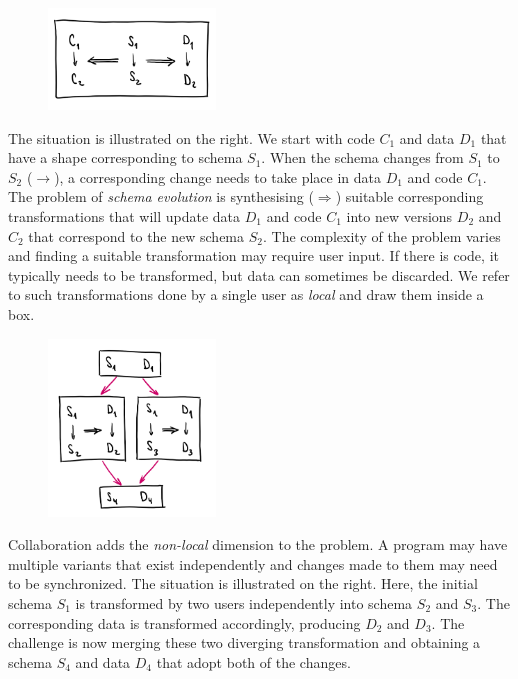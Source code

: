 \documentclass[english,crc]{programming}
\begin{document}
\begin{figure}
\vspace{-1.6em}
\includegraphics[width=12em]{figures/arr-basic.png}
\vspace{-1.6em}
\end{figure}

The situation is illustrated on the right. We start with code $C_1$ and
data $D_1$ that have a shape corresponding to schema $S_1$. When the schema changes from $S_1$ to $S_2$ ($\rightarrow$),
a corresponding change needs to take place in data $D_1$ and code $C_1$. The problem
of \emph{schema evolution} is synthesising ($\Rightarrow$) suitable corresponding transformations
that will update data $D_1$ and code $C_1$ into new versions $D_2$ and $C_2$ that correspond
to the new schema $S_2$.
%
The complexity of the problem varies and finding a suitable transformation may require user
input. If there is code, it typically needs to be transformed, but data can sometimes be
discarded. We refer to such transformations done by a single user as \emph{local} and draw
them inside a box.

\begin{figure}
\vspace{-1.5em}
\includegraphics[width=12em]{figures/arr-forkjoin.png}
\vspace{-2em}
\end{figure}

Collaboration adds the \emph{non-local} dimension to the problem. A program may have multiple
variants that exist independently and changes made to them may need to be synchronized. The
situation is illustrated on the right. Here, the initial schema $S_1$ is transformed by two
users independently into schema $S_2$ and $S_3$. The corresponding data is transformed accordingly,
producing $D_2$ and $D_3$. The challenge is now merging these two diverging transformation and
obtaining a schema $S_4$ and data $D_4$ that adopt both of the changes.
\end{document}
